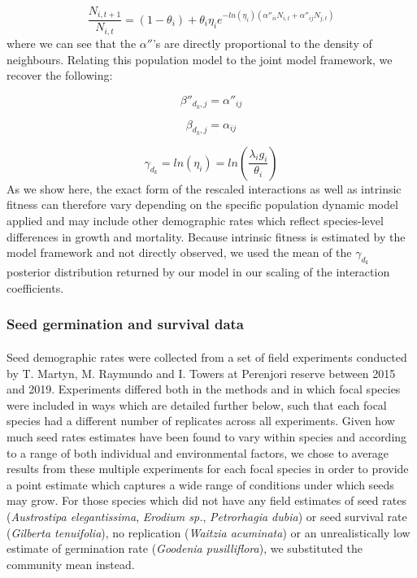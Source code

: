 \documentclass[a4,12pt]{article}
\begin{document}
        \begin{equation}
            \frac{N_{i, t+1}}{N_{i, t}} = (1 - \theta_{i}) + \theta_{i} \eta_{i} e^{-ln(\eta_{i})({\alpha}''_{ii} N_{i, t} + {\alpha}''_{ij} N_{j, t})}
        \end{equation}
        where we can see that the ${\alpha}''$'s are directly proportional to the density of neighbours. Relating this population model to the joint model framework, we recover the following: 

        \begin{equation}
        {\beta}''_{d_k, j} = {\alpha}''_{ij}
        \end{equation}

        \begin{equation}
        \beta_{d_k, j} = \alpha_{ij}
        \end{equation}

        \begin{equation}
        \gamma_{d_k}  = ln(\eta_{i}) = ln(\frac{\lambda_{i} g_{i}}{\theta_{i}})
        \end{equation}
        As we show here, the exact form of the rescaled interactions as well as intrinsic fitness can therefore vary depending on the specific population dynamic model applied and may include other demographic rates which reflect species-level differences in growth and mortality. Because intrinsic fitness is estimated by the model framework and not directly observed, we used the mean of the $\gamma_{d_k}$ posterior distribution returned by our model in our scaling of the interaction coefficients.


        \subsubsection{Seed germination and survival data}
        \label{SI:germination}

        \paragraph{}
        Seed demographic rates were collected from a set of field experiments conducted by T. Martyn, M. Raymundo and I. Towers at Perenjori reserve between 2015 and 2019. Experiments differed both in the methods and in which focal species were included in ways which are detailed further below, such that each focal species had a different number of replicates across all experiments. Given how much seed rates estimates have been found to vary within species and according to a range of both individual and environmental factors, we chose to average results from these multiple experiments for each focal species in order to provide a point estimate which captures a wide range of conditions under which seeds may grow. For those species which did not have any field estimates of seed rates (\textit{Austrostipa elegantissima}, \textit{Erodium sp.}, \textit{Petrorhagia dubia}) or seed survival rate (\textit{Gilberta tenuifolia}), no replication (\textit{Waitzia acuminata}) or an unrealistically low estimate of germination rate (\textit{Goodenia pusilliflora}), we substituted the community mean instead. 
\end{document}
